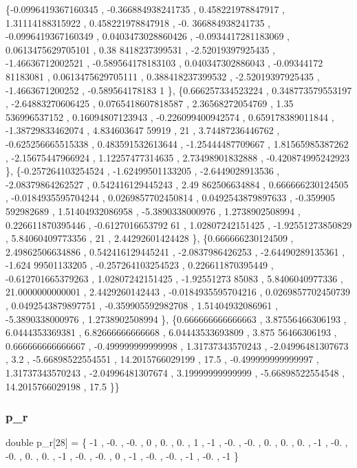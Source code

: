 \begin{DoxyCode}
\{-0.0996419367160345 , -0.366884938241735 , 0.458221978847917 ,  1.31114188315922 , 0.458221978847918 , -0.
      366884938241735 , -0.0996419367160349 , 0.0403473028860426 , -0.0934417281183069 , 0.0613475629705101 , 0.38
      8418237399531 , -2.52019397925435 , -1.46636712002521 , -0.589564178183103 , 0.040347302886043 , -0.09344172
      81183081 , 0.0613475629705111 , 0.388418237399532 , -2.52019397925435 ,  -1.4663671200252 ,  -0.589564178183
      1 \},
\{0.666257334523224 , 0.348773579553197 , -2.64883270606425 , 0.0765418607818587 ,  2.36568272054769 ,  1.35
      536996537152 ,  0.16094807123943 , -0.226099400942574 , 0.659178389011844 , -1.38729833462074 ,  4.834603647
      59919 ,                21 ,  3.74487236446762 , -0.625256665515338 , 0.483591532613644 , -1.25444487709667 ,
        1.81565985387262 , -2.15675447966924 ,  1.12257477314635 ,  2.73498901832888 , -0.420874995242923 \},
\{-0.257264103254524 , -1.62499501133205 ,  -2.6449028913536 , -2.08379864262527 , 0.542416129445243 ,  2.49
      862506634884 , 0.666666230124505 , -0.0184935595704244 , 0.0269857702450814 , 0.0492543879897633 , -0.359905
      592982689 ,  1.51404932086958 ,  -5.3890338000976 ,   1.2738902508994 , 0.226611870395446 , -0.6127016653792
      61 ,  1.02807242151425 , -1.92551273850829 ,  5.84060409773356 ,                21 ,  2.44292601424428 \},
\{0.666666230124509 ,  2.49862506634886 , 0.542416129445241 ,  -2.0837986426253 , -2.64490289135361 , -1.624
      99501133205 , -0.257264103254523 , 0.226611870395449 , -0.612701665379263 ,  1.02807242151425 ,  -1.92551273
      85083 ,   5.8406040977336 ,  21.0000000000001 ,   2.4429260142443 , -0.0184935595704216 , 0.0269857702450739
       , 0.0492543879897751 , -0.359905592982708 ,  1.51404932086961 ,  -5.3890338000976 ,   1.2738902508994 \},
\{0.666666666666663 ,  3.87556466306193 ,   6.0444353369381 ,  6.82666666666668 ,  6.04443533693809 ,  3.875
      56466306193 , 0.666666666666667 , -0.499999999999998 ,  1.31737343570243 , -2.04996481307673 ,              
       3.2 , -5.66898522554551 ,  14.2015766029199 ,              17.5 , -0.499999999999997 ,  1.31737343570243 , 
      -2.04996481307674 ,  3.19999999999999 , -5.66898522554548 ,  14.2015766029198 ,              17.5 \}\}
\end{DoxyCode}
\mbox{\label{a00521_aceab829489526c4ccfde6857debc08e0}} 
\subsubsection{\texorpdfstring{p\+\_\+r}{p\_r}}
{\footnotesize\ttfamily double p\+\_\+r\mbox{[}28\mbox{]} = \{ -\/1 , -\/0. , -\/0. , 0 , 0. , 0. , 1 , -\/1 , -\/0. , -\/0. , 0. , 0. , 0. , -\/1 , -\/0. , -\/0. , 0. , 0. , -\/1 , -\/0. , -\/0. , 0 , -\/1 , -\/0. , -\/0. , -\/1 , -\/0. , -\/1 \}}

